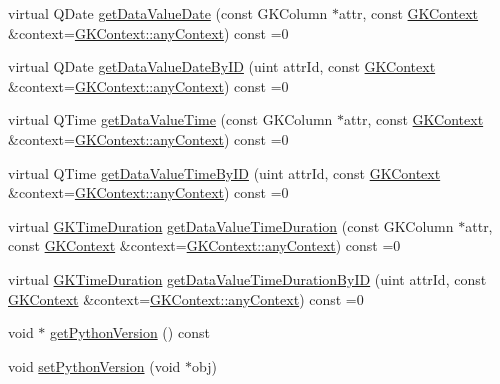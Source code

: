 \begin{DoxyCompactItemize}
\item 
virtual Q\+Date \hyperlink{classGKBaseObject_a9e488c0d638961320c57704dd541d5e1}{get\+Data\+Value\+Date} (const G\+K\+Column $\ast$attr, const \hyperlink{classGKContext}{G\+K\+Context} \&context=\hyperlink{classGKContext_a37de2dc1b6bab087b9b92a445922e79d}{G\+K\+Context\+::any\+Context}) const =0
\item 
virtual Q\+Date \hyperlink{classGKBaseObject_a3d9d2f2adfe1ea3289ce24cf1bdc882f}{get\+Data\+Value\+Date\+By\+ID} (uint attr\+Id, const \hyperlink{classGKContext}{G\+K\+Context} \&context=\hyperlink{classGKContext_a37de2dc1b6bab087b9b92a445922e79d}{G\+K\+Context\+::any\+Context}) const =0
\item 
virtual Q\+Time \hyperlink{classGKBaseObject_a9fa2cdeb7eb1067b42583e76050bf8f6}{get\+Data\+Value\+Time} (const G\+K\+Column $\ast$attr, const \hyperlink{classGKContext}{G\+K\+Context} \&context=\hyperlink{classGKContext_a37de2dc1b6bab087b9b92a445922e79d}{G\+K\+Context\+::any\+Context}) const =0
\item 
virtual Q\+Time \hyperlink{classGKBaseObject_ae9de00386b6b30c4c7156ef59cd44580}{get\+Data\+Value\+Time\+By\+ID} (uint attr\+Id, const \hyperlink{classGKContext}{G\+K\+Context} \&context=\hyperlink{classGKContext_a37de2dc1b6bab087b9b92a445922e79d}{G\+K\+Context\+::any\+Context}) const =0
\item 
virtual \hyperlink{classGKTimeDuration}{G\+K\+Time\+Duration} \hyperlink{classGKBaseObject_a06de09433e3d78066030b74ca1e56f2d}{get\+Data\+Value\+Time\+Duration} (const G\+K\+Column $\ast$attr, const \hyperlink{classGKContext}{G\+K\+Context} \&context=\hyperlink{classGKContext_a37de2dc1b6bab087b9b92a445922e79d}{G\+K\+Context\+::any\+Context}) const =0
\item 
virtual \hyperlink{classGKTimeDuration}{G\+K\+Time\+Duration} \hyperlink{classGKBaseObject_a468c98b71d1b4feff47f7d99a55d7ea1}{get\+Data\+Value\+Time\+Duration\+By\+ID} (uint attr\+Id, const \hyperlink{classGKContext}{G\+K\+Context} \&context=\hyperlink{classGKContext_a37de2dc1b6bab087b9b92a445922e79d}{G\+K\+Context\+::any\+Context}) const =0
\item 
void $\ast$ \hyperlink{classGKBaseObject_a41b254960f047a457ef059f71806eb6d}{get\+Python\+Version} () const 
\item 
void \hyperlink{classGKBaseObject_a0b654ea3bcd0a04c255deb00a3ac8d46}{set\+Python\+Version} (void $\ast$obj)
\end{DoxyCompactItemize}
